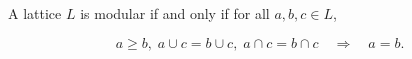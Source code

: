 A lattice $L$ is modular if and only if for all $a, b, c \in L$,

$$a \geq b,\; a \cup c = b \cup c,\; a \cap c = b \cap c \quad\Longrightarrow\quad a = b.$$
